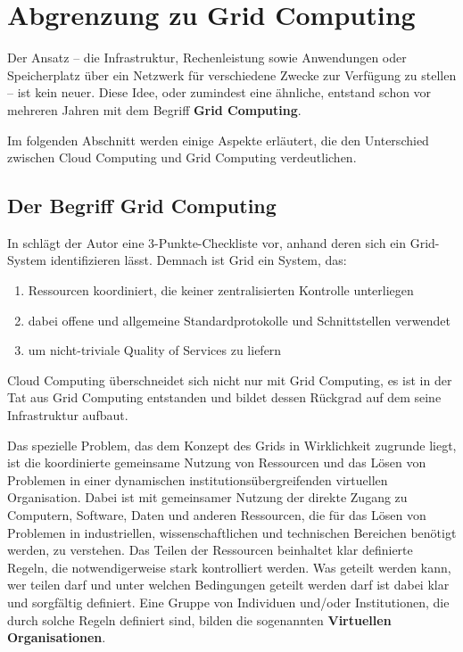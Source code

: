 \section{Abgrenzung zu Grid Computing}
Der Ansatz -- die Infrastruktur, Rechenleistung sowie Anwendungen oder Speicherplatz über ein Netzwerk für verschiedene Zwecke zur Verfügung zu stellen -- ist kein neuer.
Diese Idee, oder zumindest eine ähnliche, entstand schon vor mehreren Jahren mit dem Begriff \textbf{Grid Computing}.

Im folgenden Abschnitt werden einige Aspekte erläutert, die den Unterschied zwischen Cloud Computing und Grid Computing verdeutlichen.
 
\subsection{Der Begriff \glqq Grid Computing\grqq}
In \cite{grid-checklist} schlägt der Autor eine 3-Punkte-Checkliste vor, anhand deren sich ein Grid-System identifizieren lässt. Demnach ist Grid ein System, das:
\begin{enumerate}
  \item Ressourcen koordiniert, die keiner zentralisierten Kontrolle unterliegen
  \item dabei offene und allgemeine Standardprotokolle und Schnittstellen verwendet
  \item um nicht-triviale \glqq Quality of Services\grqq{} zu liefern
\end{enumerate}

Cloud Computing überschneidet sich nicht nur mit Grid Computing, es ist in der Tat aus Grid Computing entstanden und bildet dessen Rückgrad auf dem seine Infrastruktur aufbaut\cite{360-degree-compared}.

Das spezielle Problem, das dem Konzept des Grids in Wirklichkeit zugrunde liegt,
ist die koordinierte gemeinsame Nutzung von Ressourcen und das Lösen von Problemen
in einer dynamischen institutionsübergreifenden virtuellen Organisation.
Dabei ist mit \glqq gemeinsamer Nutzung\grqq{} der direkte Zugang zu Computern, Software, Daten und anderen Ressourcen,
die für das Lösen von Problemen in industriellen, wissenschaftlichen und technischen Bereichen benötigt werden, zu verstehen.
Das Teilen der Ressourcen beinhaltet klar definierte Regeln, die notwendigerweise stark kontrolliert werden.
Was geteilt werden kann, wer teilen darf und unter welchen Bedingungen geteilt werden darf ist dabei klar und sorgfältig definiert.
Eine Gruppe von Individuen und/oder Institutionen, die durch solche Regeln definiert sind,
bilden die sogenannten \textbf{Virtuellen Organisationen}.\cite{anatomy-of-grid}

